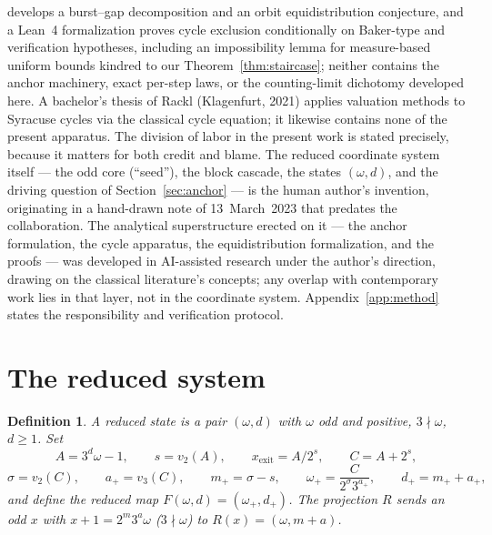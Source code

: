 \documentclass[11pt]{article}
\newtheorem{definition}[theorem]{Definition}
\theoremstyle{remark}
\newcommand{\vt}[1]{v_2\!\left(#1\right)}
\newcommand{\vth}[1]{v_3\!\left(#1\right)}
\newcommand{\w}{\omega}
\newcommand{\wnext}{\w_{+}}
\newcommand{\dnext}{d_{+}}
\begin{document}
\cite{llmcollatz} develops a burst--gap decomposition and an orbit equidistribution conjecture, and a Lean~4 formalization \cite{merle} proves cycle exclusion conditionally on Baker-type and verification hypotheses, including an impossibility lemma for measure-based uniform bounds kindred to our Theorem~\ref{thm:staircase}; neither contains the anchor machinery, exact per-step laws, or the counting-limit dichotomy developed here. A bachelor's thesis of Rackl (Klagenfurt, 2021) applies valuation methods to Syracuse cycles via the classical cycle equation; it likewise contains none of the present apparatus. The division of labor in the present work is stated precisely, because it matters for both credit and blame. The reduced coordinate system itself --- the odd core (``seed''), the block cascade, the states $(\w,d)$, and the driving question of Section~\ref{sec:anchor} --- is the human author's invention, originating in a hand-drawn note of 13~March~2023 that predates the collaboration. The analytical superstructure erected on it --- the anchor formulation, the cycle apparatus, the equidistribution formalization, and the proofs --- was developed in AI-assisted research under the author's direction, drawing on the classical literature's concepts; any overlap with contemporary work lies in that layer, not in the coordinate system. Appendix~\ref{app:method} states the responsibility and verification protocol.

\section{The reduced system}\label{sec:reduced}

\begin{definition}\label{def:reduced}
A \emph{reduced state} is a pair $(\w, d)$ with $\w$ odd and positive, $3\nmid\w$, $d \ge 1$. Set
\[ A = 3^d\w - 1,\qquad s = \vt{A},\qquad x_{\mathrm{exit}} = A/2^s,\qquad C = A + 2^s, \]
\[ \sigma = \vt{C},\qquad a_+ = \vth{C},\qquad m_+ = \sigma - s,\qquad \wnext = \frac{C}{2^{\sigma}3^{a_+}},\qquad \dnext = m_+ + a_+, \]
and define the \emph{reduced map} $F(\w,d) = (\wnext, \dnext)$. The \emph{projection} $R$ sends an odd $x$ with $x + 1 = 2^m 3^a \w$ ($3\nmid\w$) to $R(x) = (\w, m + a)$.
\end{definition}
\end{document}
